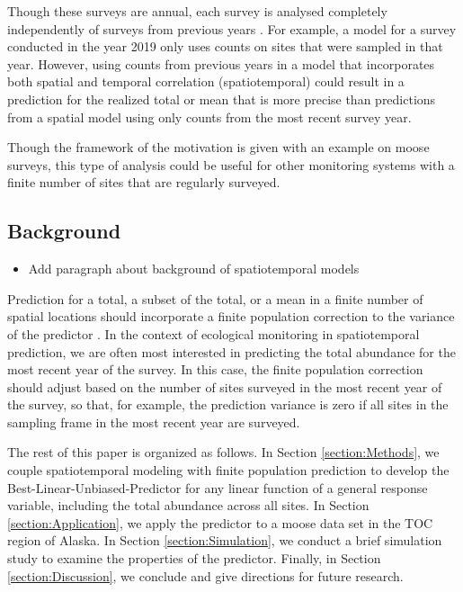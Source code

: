 \documentclass[]{interact}
\theoremstyle{plain}%
\theoremstyle{definition}
\theoremstyle{remark}
\providecommand{\tightlist}{%
  \setlength{\itemsep}{0pt}\setlength{\parskip}{0pt}}
\def\tightlist{}
\begin{document}
Though these surveys are annual, each survey is analysed completely
independently of surveys from previous years
\citep[e.g.][]{gasaway1986estimating, kellie_geospatial_2006, boertje2009managing, peters2014contrasting}.
For example, a model for a survey conducted in the year 2019 only uses
counts on sites that were sampled in that year. However, using counts
from previous years in a model that incorporates both spatial and
temporal correlation (spatiotemporal) could result in a prediction for
the realized total or mean that is more precise than predictions from a
spatial model using only counts from the most recent survey year.

Though the framework of the motivation is given with an example on moose
surveys, this type of analysis could be useful for other monitoring
systems with a finite number of sites that are regularly surveyed.

\subsection{Background}

\begin{itemize}
\tightlist
\item
  Add paragraph about background of spatiotemporal models
\end{itemize}

Prediction for a total, a subset of the total, or a mean in a finite
number of spatial locations should incorporate a finite population
correction to the variance of the predictor
\citep{ver2008spatial, higham2021adjusting}. In the context of
ecological monitoring in spatiotemporal prediction, we are often most
interested in predicting the total abundance for the most recent year of
the survey. In this case, the finite population correction should adjust
based on the number of sites surveyed in the most recent year of the
survey, so that, for example, the prediction variance is zero if all
sites in the sampling frame in the most recent year are surveyed.

The rest of this paper is organized as follows. In Section
\ref{section:Methods}, we couple spatiotemporal modeling with finite
population prediction to develop the Best-Linear-Unbiased-Predictor for
any linear function of a general response variable, including the total
abundance across all sites. In Section \ref{section:Application}, we
apply the predictor to a moose data set in the TOC region of Alaska. In
Section \ref{section:Simulation}, we conduct a brief simulation study to
examine the properties of the predictor. Finally, in Section
\ref{section:Discussion}, we conclude and give directions for future
research.
\end{document}

